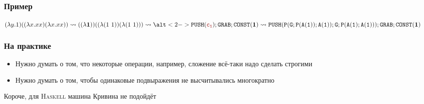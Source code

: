 \begin{frame}
  \frametitle{Пример}
  \begin{wide}
    $(\lambda y . 1) ((\lambda x. x x)(\lambda x. x x)) \rightsquigarrow ((\lambda \mathbf{1}))((\lambda (1 \ 1))(\lambda (1 \ 1))) \rightsquigarrow \alt<2->{\mathtt{PUSH({\color{myRed} c_1}); GRAB; CONST(\mathbf{1})}}{\\ \rightsquigarrow \mathtt{PUSH(P(G; P(A(1)); A(1)); G; P(A(1); A(1))); GRAB; CONST(\mathbf{1})}}$
  \end{wide}
\end{frame}

\begin{frame}
  \frametitle{На практике}
  \begin{itemize}
    \item Нужно думать о том, что некоторые операции, например, сложение всё-таки надо сделать строгими
    \item Нужно думать о том, чтобы одинаковые подвыражения не высчитывались многократно
  \end{itemize}
  Короче, для \textsc{Haskell} машина Кривина не подойдёт
\end{frame}

